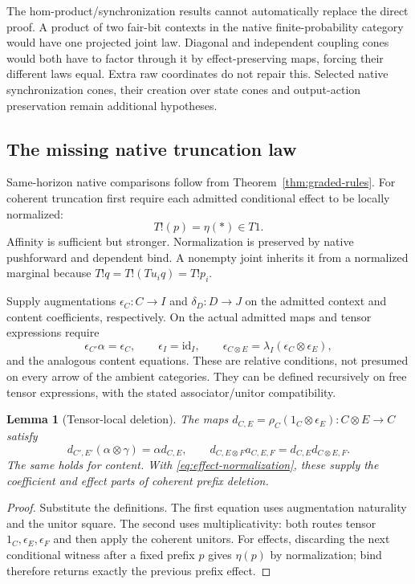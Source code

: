 \documentclass[11pt]{article}
\newtheorem{lemma}[theorem]{Lemma}
\newcommand{\id}{\mathrm{id}}
\begin{document}
The hom-product/synchronization results cannot automatically replace the direct proof. A product of two fair-bit contexts in the native finite-probability category would have one projected joint law. Diagonal and independent coupling cones would both have to factor through it by effect-preserving maps, forcing their different laws equal. Extra raw coordinates do not repair this. Selected native synchronization cones, their creation over state cones and output-action preservation remain additional hypotheses.

\subsection{The missing native truncation law}

Same-horizon native comparisons follow from Theorem~\ref{thm:graded-rules}. For coherent truncation first require each admitted conditional effect to be locally normalized:
\[
 T!(p)=\eta(*)\in T1. \tag{EN}\label{eq:effect-normalization}
\]
Affinity is sufficient but stronger. Normalization is preserved by native pushforward and dependent bind. A nonempty joint inherits it from a normalized marginal because $T!q=T!(Tu_iq)=T!p_i$.

Supply augmentations $\epsilon_C:C\to I$ and $\delta_D:D\to J$ on the admitted context and content coefficients, respectively. On the actual admitted maps and tensor expressions require
\[
 \epsilon_{C'}\alpha=\epsilon_C,\qquad \epsilon_I=\id_I,\qquad
 \epsilon_{C\otimes E}=\lambda_I(\epsilon_C\otimes\epsilon_E),
 \tag{AD}\label{eq:relative-discard}
\]
and the analogous content equations. These are relative conditions, not presumed on every arrow of the ambient categories. They can be defined recursively on free tensor expressions, with the stated associator/unitor compatibility.

\begin{lemma}[Tensor-local deletion]\label{lem:graded-discard}
The maps $d_{C,E}=\rho_C(1_C\otimes\epsilon_E):C\otimes E\to C$ satisfy
\[
 d_{C',E'}(\alpha\otimes\gamma)=\alpha d_{C,E},\qquad
 d_{C,E\otimes F}a_{C,E,F}=d_{C,E}d_{C\otimes E,F}.
 \tag{DT}\label{eq:discard-coherence}
\]
The same holds for content. With \eqref{eq:effect-normalization}, these supply the coefficient and effect parts of coherent prefix deletion.
\end{lemma}
\begin{proof}
Substitute the definitions. The first equation uses augmentation naturality and the unitor square. The second uses multiplicativity: both routes tensor $1_C,\epsilon_E,\epsilon_F$ and then apply the coherent unitors. For effects, discarding the next conditional witness after a fixed prefix $p$ gives $\eta(p)$ by normalization; bind therefore returns exactly the previous prefix effect.
\end{proof}
\end{document}
